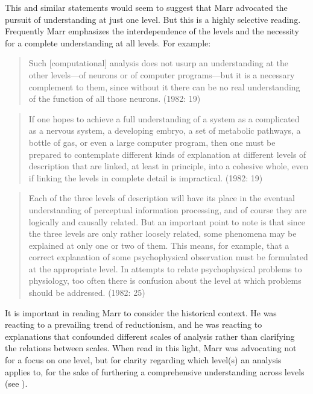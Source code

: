 This and similar statements would seem to suggest that Marr advocated the pursuit of understanding at just one level. But this is a highly selective reading. Frequently Marr emphasizes the interdependence of the levels and the necessity for a complete understanding at all levels. For example:

\begin{quote} 
Such [computational] analysis does not usurp an understanding at the other levels—of neurons or of computer programs—but it is a necessary complement to them, since without it there can be no real understanding of the function of all those neurons. (1982: 19)
\end{quote}

\begin{quote}
If one hopes to achieve a full understanding of a system as a complicated as a nervous system, a developing embryo, a set of metabolic pathways, a bottle of gas, or even a large computer program, then one must be prepared to contemplate different kinds of explanation at different levels of description that are linked, at least in principle, into a cohesive whole, even if linking the levels in complete detail is impractical. (1982: 19)
\end{quote}

\begin{quote} 
Each of the three levels of description will have its place in the eventual understanding of perceptual information processing, and of course they are logically and causally related. But an important point to note is that since the three levels are only rather loosely related, some phenomena may be explained at only one or two of them. This means, for example, that a correct explanation of some psychophysical observation must be formulated at the appropriate level. In attempts to relate psychophysical problems to physiology, too often there is confusion about the level at which problems should be addressed. (1982: 25)
\end{quote}

It is important in reading Marr to consider the historical context. He was reacting to a prevailing trend of reductionism, and he was reacting to explanations that confounded different scales of analysis rather than clarifying the relations between scales. When read in this light, Marr was advocating not for a focus on one level, but for clarity regarding which level(s) an analysis applies to, for the sake of furthering a comprehensive understanding across levels (see \citealt{EliasmithKolbeck2015}). 

